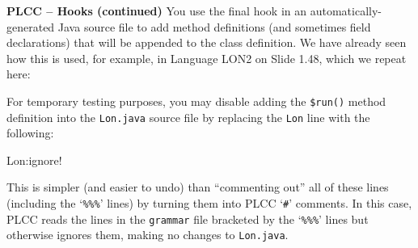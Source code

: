 \begin{minipage}[t]{\sw}
\slidenumber
\LARGE
{\bf PLCC -- Hooks (continued)}\exx
You use the final hook in an automatically-generated Java source file
to add method definitions (and sometimes field declarations)
that will be appended to the class definition.
We have already seen how this is used,
for example, in Language LON2 on Slide 1.48,
which we repeat here:
{\Large
{}
}
For temporary testing purposes,
you may disable adding the \verb'$run()' method definition
into the \verb'Lon.java' source file
by replacing the \verb'Lon' line with the following:
\begin{qv}
Lon:ignore!
\end{qv}
This is simpler (and easier to undo) than 
``commenting out'' all of these lines
(including the `\verb'%%%'' lines)
by turning them into PLCC `\verb'#'' comments.
In this case, PLCC reads the lines
in the \verb'grammar' file bracketed by the `\verb'%%%'' lines
but otherwise ignores them, making no changes
to \verb'Lon.java'.
\end{minipage}
\clearpage
